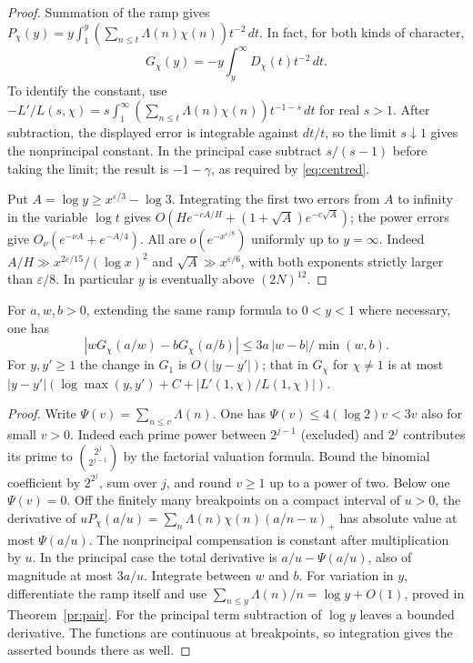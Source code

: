 \begin{proof}
Summation of the ramp gives
\(P_\chi(y)=y\int_1^y(\sum_{n\le t}\Lambda(n)\chi(n))t^{-2}\,dt\).
In fact, for both kinds of character,
\[
            G_\chi(y)=-y\int_y^\infty D_\chi(t)t^{-2}\,dt .
\]
To identify the constant, use
\(-L'/L(s,\chi)=s\int_1^\infty
(\sum_{n\le t}\Lambda(n)\chi(n))t^{-1-s}\,dt\) for real \(s>1\).
After subtraction, the displayed error is integrable against \(dt/t\),
so the limit \(s\downarrow1\) gives the nonprincipal constant. In the
principal case subtract \(s/(s-1)\) before taking the limit; the
result is \(-1-\gamma\), as required by \eqref{eq:centred}.

Put \(A=\log y\ge x^{\varepsilon/3}-\log3\). Integrating the first two
errors from \(A\) to infinity in the variable \(\log t\) gives
\(O(H e^{-c A/H}+(1+\sqrt A)e^{-c\sqrt A})\);
the power errors give \(O_\nu(e^{-\nu A}+e^{-A/4})\).
All are \(o(e^{-x^{\varepsilon/8}})\) uniformly up to \(y=\infty\).
Indeed \(A/H\gg x^{2\varepsilon/15}/(\log x)^2\) and
\(\sqrt A\gg x^{\varepsilon/6}\), with both exponents strictly larger
than \(\varepsilon/8\). In particular \(y\) is eventually above
\((2N)^{12}\).
\end{proof}

\begin{lemma}\label{host:variation}
For \(a,w,b>0\), extending the same ramp formula to \(0<y<1\) where
necessary, one has
\[
 |wG_\chi(a/w)-bG_\chi(a/b)|\le 3a\,|w-b|/\min(w,b).
\]
For \(y,y'\ge1\) the change in \(G_1\) is \(O(|y-y'|)\); that in
\(G_\chi\) for \(\chi\ne1\) is at most
\(|y-y'|(\log\max(y,y')+C+|L'(1,\chi)/L(1,\chi)|)\).
\end{lemma}
\begin{proof}
Write \(\Psi(v)=\sum_{n\le v}\Lambda(n)\). One has
\(\Psi(v)\le 4(\log2)v<3v\) also for small \(v>0\).
Indeed each prime power between \(2^{j-1}\) (excluded) and \(2^j\)
contributes its prime to \(\binom{2^j}{2^{j-1}}\) by the factorial
valuation formula. Bound the binomial coefficient by \(2^{2^j}\), sum
over \(j\), and round \(v\ge1\) up to a power of two. Below one
\(\Psi(v)=0\). Off the finitely many breakpoints on a compact interval
of \(u>0\), the derivative of
\(uP_\chi(a/u)=\sum_n\Lambda(n)\chi(n)(a/n-u)_+\)
has absolute value at most \(\Psi(a/u)\).
The nonprincipal compensation is constant after multiplication by \(u\).
In the principal case the total derivative is \(a/u-\Psi(a/u)\),
also of magnitude at most \(3a/u\). Integrate between \(w\) and \(b\).
For variation in \(y\), differentiate the ramp itself and use
\(\sum_{n\le y}\Lambda(n)/n=\log y+O(1)\), proved in
Theorem~\ref{pr:pair}. For the principal term subtraction of \(\log y\)
leaves a bounded derivative. The functions are continuous at breakpoints,
so integration gives the asserted bounds there as well.
\end{proof}

